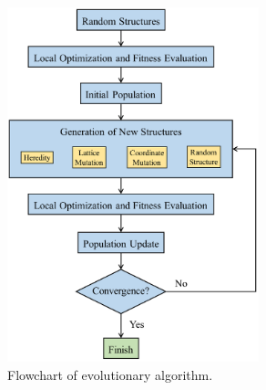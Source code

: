     \begin{figure}[htbp]
        \centering
        \captionsetup{singlelinecheck = false, justification=justified}
        \includegraphics[width=0.65\textwidth]{EA_flowchart.png}
        \caption[Flowchart of evolutionary algorithm.]{Flowchart of evolutionary algorithm.}
        \label{fig:EA_flowchart}
    \end{figure}








    
    \pagebreak  


